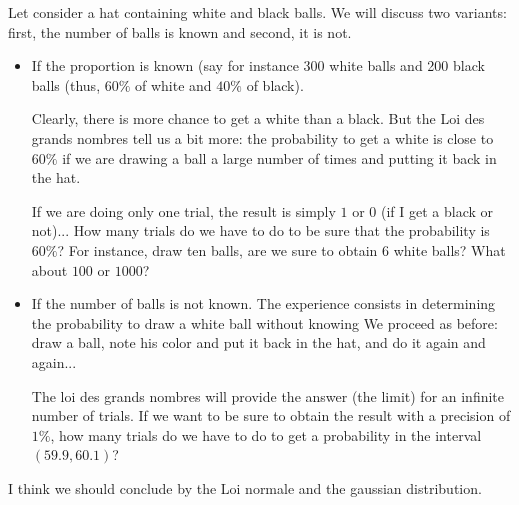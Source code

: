 \bigskip

Let consider a hat containing white and black balls.
We will discuss two variants: first, the number of balls is known and second, it is not.

\begin{itemize}
\item If the proportion is known (say for instance 300 white balls and 200 black balls
(thus, $60\%$ of white and $40\%$ of black).

Clearly, there is more chance to get a white than a black.
But the Loi des grands nombres tell us a bit more: the probability to get a white is close to $60\%$
if we are drawing a ball a large number of times and putting it back in the hat.

If we are doing only one trial, the result is simply $1$ or $0$ (if I get a black or not)...
How many trials do we have to do to be sure that the probability is $60\%$?
For instance, draw ten balls, are we sure to obtain $6$ white balls? What about $100$ or $1000$?
\item If the number of balls is not known.
The experience consists in determining the probability to draw a white ball without knowing 
We proceed as before:
draw a ball, note his color and put it back in the hat, and do it again and again...

The loi des grands nombres will provide the answer (the limit) for an infinite number of trials.
If we want to be sure to obtain the result with a precision of $1\%$,
how many trials do we have to do to get a probability in the interval $(59.9,60.1)$?
\end{itemize}

\medskip

\noindent {}
\bigskip

I think we should conclude by the Loi normale and the gaussian distribution. 

